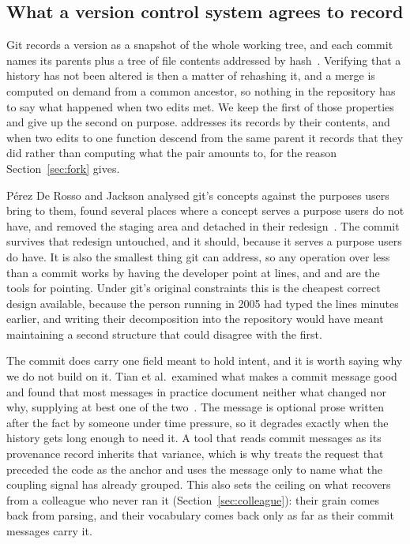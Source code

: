 \subsection{What a version control system agrees to record}

Git records a version as a snapshot of the whole working tree, and each commit
names its parents plus a tree of file contents addressed by hash~\cite{git2026}.
Verifying that a history has not been altered is then a matter of rehashing it,
and a merge is computed on demand from a common ancestor, so nothing in the
repository has to say what happened when two edits met. We keep the first of those
properties and give up the second on purpose. \sgt{} addresses its records by
their contents, and when two edits to one function descend from the same parent it
records that they did rather than computing what the pair amounts to, for the
reason Section~\ref{sec:fork} gives.

Pérez De Rosso and Jackson analysed git's concepts against the purposes users
bring to them, found several places where a concept serves a purpose users do not
have, and removed the staging area and detached  in their
redesign~\cite{perezderosso2013,perezderosso2016}. The commit survives that
redesign untouched, and it should, because it serves a purpose users do have. It
is also the smallest thing git can address, so any operation over less than a
commit works by having the developer point at lines, and  and
 are the tools for pointing. Under git's original constraints
this is the cheapest correct design available, because the person running
 in 2005 had typed the lines minutes earlier, and writing their
decomposition into the repository would have meant maintaining a second structure
that could disagree with the first.

The commit does carry one field meant to hold intent, and it is worth saying why
we do not build on it. Tian et al.\ examined what makes a commit message good and
found that most messages in practice document neither what changed nor why,
supplying at best one of the two~\cite{tian2022}. The message is optional prose
written after the fact by someone under time pressure, so it degrades exactly
when the history gets long enough to need it. A tool that reads commit messages
as its provenance record inherits that variance, which is why \sgt{} treats the
request that preceded the code as the anchor and uses the message only to name
what the coupling signal has already grouped. This also sets the ceiling on what
\sgt{} recovers from a colleague who never ran it (Section~\ref{sec:colleague}):
their grain comes back from parsing, and their vocabulary comes back only as far
as their commit messages carry it.

